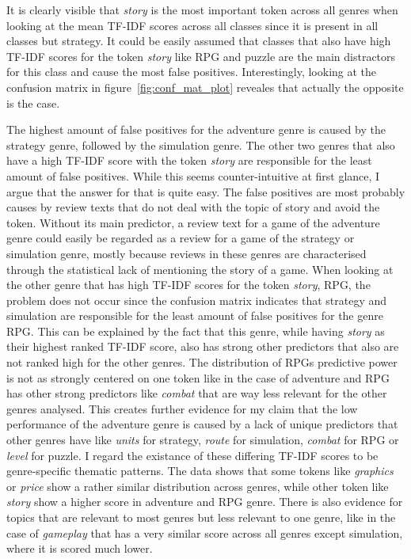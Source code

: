 \documentclass[11pt, a4paper]{article}
\begin{document}


It is clearly visible that \textit{story} is the most important token across all genres when looking at the mean TF-IDF
scores across all classes since it is present in all classes but strategy.
It could be easily assumed that classes that also have high TF-IDF scores for the token \textit{story} like RPG and
puzzle are the main distractors for this class and cause the most false positives.
Interestingly, looking at the confusion matrix in figure~\ref{fig:conf_mat_plot} reveales that actually the opposite
is the case.



The highest amount of false positives for the adventure genre is caused by the strategy genre, followed by the
simulation genre.
The other two genres that also have a high TF-IDF score with the token \textit{story} are responsible for the least
amount of false positives.
While this seems counter-intuitive at first glance, I argue that the answer for that is quite easy.
The false positives are most probably causes by review texts that do not deal with the topic of story and avoid the
token.
Without its main predictor, a review text for a game of the adventure genre could easily be regarded as a review for
a game of the strategy or simulation genre, mostly because reviews in these genres are characterised through the
statistical lack of mentioning the story of a game.
When looking at the other genre that has high TF-IDF scores for the token \textit{story}, RPG, the problem does not
occur since the confusion matrix indicates that strategy and simulation are responsible for the least amount of false
positives for the genre RPG.
This can be explained by the fact that this genre, while having \textit{story} as their highest ranked TF-IDF score,
also has strong other predictors that also are not ranked high for the other genres.
The distribution of RPGs predictive power is not as strongly centered on one token like in the case
of adventure and RPG has other strong predictors like \textit{combat} that are way less relevant for the other genres
analysed.
This creates further evidence for my claim that the low performance of the adventure genre is caused by a lack of unique
predictors that other genres have like \textit{units} for strategy, \textit{route} for simulation, \textit{combat} for
RPG or \textit{level} for puzzle.
I regard the existance of these differing TF-IDF scores to be genre-specific thematic patterns.
The data shows that some tokens like \textit{graphics} or \textit{price} show a rather similar
distribution across genres, while other token like \textit{story} show a higher score in adventure and RPG genre.
There is also evidence for topics that are relevant to most genres but less relevant to one genre, like in the case of
\textit{gameplay} that has a very similar score across all genres except simulation, where it is scored much
lower.
\end{document}
